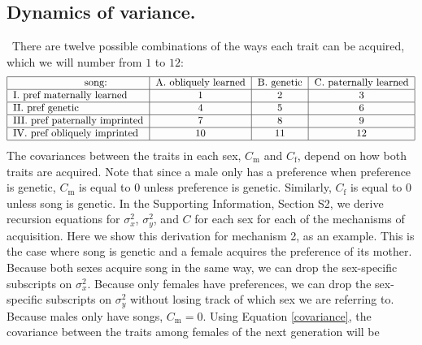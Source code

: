 \documentclass[12pt]{article}
\newcommand{\x}[1]{\text{#1}}
\begin{document}
\subsection*{Dynamics of variance. }
\ There are twelve possible combinations of the ways each trait can be acquired, which we will number from $1$ to $12$: 
\newline
\begin{equation*}
\begin{tabular}{|l|c|c|c|}
\hline\ \ \ \ \ \ \ \ \ \ \ \ \ \ \ \ \ \ \ \ \ song:  & A. obliquely learned  & B. genetic & C.  paternally learned
\\\hline I. pref maternally learned & 1 & 2 & 3
\\\hline II. pref genetic & 4 & 5 & 6
\\\hline III. pref paternally imprinted & 7 & 8 & 9
\\\hline IV. pref obliquely imprinted & 10 & 11 & 12
\\\hline
\end{tabular}
\end{equation*}
\newline
The covariances between the traits in each sex, $C_\x{m}$ and $C_\x{f}$, depend on how both traits are acquired. Note that since a male only has a preference when preference is genetic, $C_\x{m}$ is equal to $0$ unless preference is genetic. Similarly, $C_\x{f}$ is equal to $0$ unless song is genetic.
In the Supporting Information, Section S2, we derive recursion equations for $\sigma_x^2$, $\sigma_y^2$, and $C$ for each sex for each of the mechanisms of acquisition. Here we show this derivation for mechanism 2, as an example. This is the case where song is genetic and a female acquires the preference of its mother. Because both sexes acquire song in the same way, we can drop the sex-specific subscripts on $\sigma_x^2$. Because only females have preferences, we can drop the sex-specific subscripts on $\sigma_y^2$ without losing track of which sex we are referring to. Because males only have songs, $C_\x{m}=0$. Using Equation \ref{covariance}, the covariance between the traits among females of the next generation will be 
\end{document}

